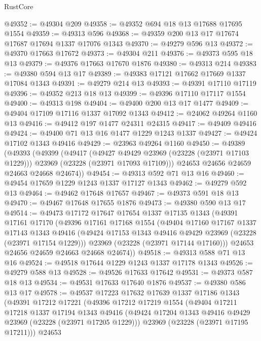 \begin{lexlean}{RustCore}
\begin{coremodule}
@49352 := @49304 @209
@49358 := @49352 @694 @18 @13 @17688 @17695 @1554
@49359 := @49313 @596
@49368 := @49359 @200 @13 @17 @17674 @17687 @17694 @1337 @17076 @1343
@49370 := @49279 @596 @13
@49372 := @49370 @17663 @17672
@49373 := @49304 @211
@49376 := @49373 @595 @18 @13
@49379 := @49376 @17663 @17670 @1876
@49380 := @49313 @214
@49383 := @49380 @594 @13 @17
@49389 := @49383 @17121 @17662 @17669 @1337 @17084 @1343
@49391 := @49279 @214 @13
@49393 := @49391 @17110 @17119
@49396 := @49352 @213 @18 @13
@49399 := @49396 @17110 @17117 @1554
@49400 := @49313 @198
@49404 := @49400 @200 @13 @17 @1477
@49409 := @49404 @17109 @17116 @1337 @17092 @1343
@49412 := @24062 @49264 @1160 @13
@49416 := @49412 @197 @1477 @24311 @24315
@49417 := @49409 @49416
@49424 := @49400 @71 @13 @16 @1477 @1229 @1243 @1337
@49427 := @49424 @17102 @1343 @49416
@49429 := @23963 @49264 @1160
@49450 := @49389
    (@49393
      (@49399
        (@49417
          (@49427 @49429 @23969 (@23228 (@23971 @17103 @1229)))
          @23969
          (@23228 (@23971 @17093 @17109)))
        @24653
        @24656
        @24659
        @24663
        @24668
        @24674))
@49454 := @49313 @592 @71 @13 @16
@49460 := @49454 @17659 @1229 @1243 @1337 @17127 @1343
@49462 := @49279 @592 @13
@49464 := @49462 @17648 @17657
@49467 := @49373 @591 @18 @13
@49470 := @49467 @17648 @17655 @1876
@49473 := @49380 @590 @13 @17
@49514 := @49473
    @17172
    @17647
    @17654
    @1337
    @17135
    @1343
    (@49391
      @17161
      @17170
      (@49396
        @17161
        @17168
        @1554
        (@49404
          @17160
          @17167
          @1337
          @17143
          @1343
          @49416
          (@49424 @17153 @1343 @49416 @49429 @23969 (@23228 (@23971 @17154 @1229)))
          @23969
          (@23228 (@23971 @17144 @17160)))
        @24653
        @24656
        @24659
        @24663
        @24668
        @24674))
@49518 := @49313 @588 @71 @13 @16
@49524 := @49518 @17644 @1229 @1243 @1337 @17178 @1343
@49526 := @49279 @588 @13
@49528 := @49526 @17633 @17642
@49531 := @49373 @587 @18 @13
@49534 := @49531 @17633 @17640 @1876
@49537 := @49380 @586 @13 @17
@49578 := @49537
    @17223
    @17632
    @17639
    @1337
    @17186
    @1343
    (@49391
      @17212
      @17221
      (@49396
        @17212
        @17219
        @1554
        (@49404
          @17211
          @17218
          @1337
          @17194
          @1343
          @49416
          (@49424 @17204 @1343 @49416 @49429 @23969 (@23228 (@23971 @17205 @1229)))
          @23969
          (@23228 (@23971 @17195 @17211)))
        @24653

\end{coremodule}
\end{lexlean}
